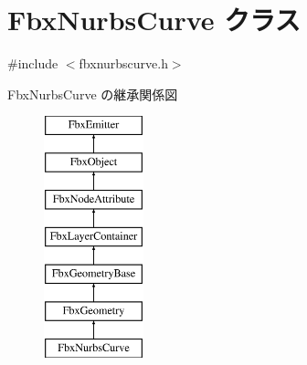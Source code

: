 \hypertarget{class_fbx_nurbs_curve}{}\section{Fbx\+Nurbs\+Curve クラス}
\label{class_fbx_nurbs_curve}


{\ttfamily \#include $<$fbxnurbscurve.\+h$>$}

Fbx\+Nurbs\+Curve の継承関係図\begin{figure}[H]
\begin{center}
\leavevmode
\includegraphics[height=7.000000cm]{class_fbx_nurbs_curve}
\end{center}
\end{figure}
